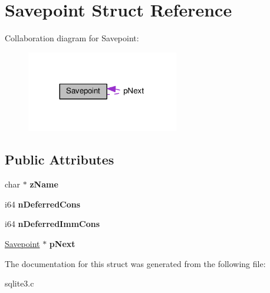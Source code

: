 \hypertarget{structSavepoint}{}\section{Savepoint Struct Reference}
\label{structSavepoint}


Collaboration diagram for Savepoint\+:\nopagebreak
\begin{figure}[H]
\begin{center}
\leavevmode
\includegraphics[width=188pt]{structSavepoint__coll__graph}
\end{center}
\end{figure}
\subsection*{Public Attributes}
\begin{DoxyCompactItemize}
\item 
char $\ast$ {\bfseries z\+Name}\hypertarget{structSavepoint_a0ba08ea77fcfd93099288375e2e9b1ec}{}\label{structSavepoint_a0ba08ea77fcfd93099288375e2e9b1ec}

\item 
i64 {\bfseries n\+Deferred\+Cons}\hypertarget{structSavepoint_ae00dd8f725701d9e31da2edbb0b27435}{}\label{structSavepoint_ae00dd8f725701d9e31da2edbb0b27435}

\item 
i64 {\bfseries n\+Deferred\+Imm\+Cons}\hypertarget{structSavepoint_a91b8cb5fac1bdf7d8f76ec30c82b862d}{}\label{structSavepoint_a91b8cb5fac1bdf7d8f76ec30c82b862d}

\item 
\hyperlink{structSavepoint}{Savepoint} $\ast$ {\bfseries p\+Next}\hypertarget{structSavepoint_a8d785c3c0eeb6f0c62ea5391892c78cb}{}\label{structSavepoint_a8d785c3c0eeb6f0c62ea5391892c78cb}

\end{DoxyCompactItemize}


The documentation for this struct was generated from the following file\+:\begin{DoxyCompactItemize}
\item 
sqlite3.\+c\end{DoxyCompactItemize}

